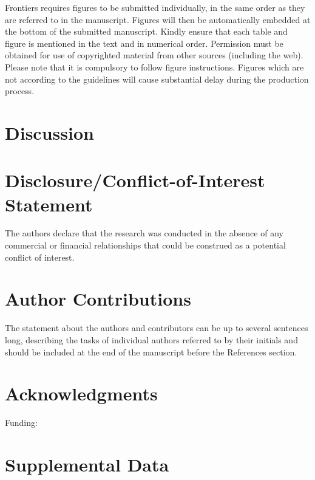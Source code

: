\documentclass[]{article}
\begin{document}
Frontiers requires figures to be submitted individually, in the same order as
they are referred to in the manuscript. Figures will then be automatically
embedded at the bottom of the submitted manuscript. Kindly ensure that each
table and figure is mentioned in the text and in numerical order. Permission
must be obtained for use of copyrighted material from other sources (including
the web). Please note that it is compulsory to follow figure instructions.
Figures which are not according to the guidelines will cause substantial delay
during the production process.

\hypertarget{discussion}{%
\section{Discussion}\label{discussion}}

\hypertarget{disclosureconflict-of-interest-statement}{%
\section*{Disclosure/Conflict-of-Interest Statement}\label{disclosureconflict-of-interest-statement}}

The authors declare that the research was conducted in the absence of any
commercial or financial relationships that could be construed as a potential
conflict of interest.

\hypertarget{author-contributions}{%
\section*{Author Contributions}\label{author-contributions}}

The statement about the authors and contributors can be up to several sentences
long, describing the tasks of individual authors referred to by their initials
and should be included at the end of the manuscript before the References
section.

\hypertarget{acknowledgments}{%
\section*{Acknowledgments}\label{acknowledgments}}

Funding:

\hypertarget{supplemental-data}{%
\section{Supplemental Data}\label{supplemental-data}}
\end{document}
